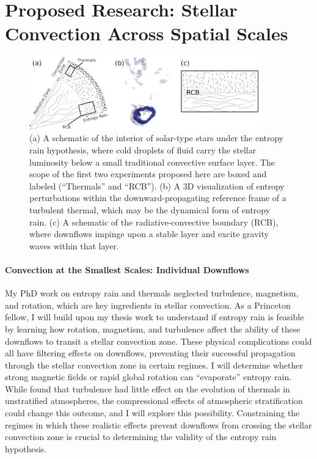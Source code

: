 \documentclass[onecolumn, hmargin=1in, vmargin=1in]{aastex62}
\begin{document}
\section*{\textbf{Proposed Research: Stellar Convection Across Spatial Scales}} 
\begin{figure}[t]
	\begin{center}
    \includegraphics[width=0.9\textwidth]{./figs/tri_panel.png}
	\end{center}
    \caption{ (a) A schematic of the interior of solar-type stars under the entropy rain hypothesis, where cold droplets of fluid carry the stellar luminosity below a small traditional convective surface layer.
	The scope of the first two experiments proposed here are boxed and labeled (``Thermals'' and ``RCB'').
	(b) A 3D visualization of entropy perturbations within the downward-propagating reference frame of a turbulent thermal, which may be the dynamical form of entropy rain.
	(c) A schematic of the radiative-convective boundary (RCB), where downflows impinge upon a stable layer and excite gravity waves within that layer.
	\label{fig:tri_panel} }
	\vspace{-17pt}
\end{figure}

\paragraph{Convection at the Smallest Scales: Individual Downflows} 
My PhD work on entropy rain and thermals \citep[][described above]{andersLB2019} neglected turbulence, magnetism, and rotation, which are key ingredients in stellar convection.
As a Princeton fellow, I will build upon my thesis work to understand if entropy rain is feasible by learning how rotation, magnetism, and turbulence affect the ability of these downflows to transit a stellar convection zone.
These physical complications could all have filtering effects on downflows, preventing their successful propagation through the stellar convection zone in certain regimes.
I will determine whether strong magnetic fields or rapid global rotation can ``evaporate'' entropy rain.
While \citet{lecoanet&jeevanjee2019} found that turbulence had little effect on the evolution of thermals in unstratified atmospheres, the compressional effects of atmospheric stratification could change this outcome, and I will explore this possibility.
Constraining the regimes in which these realistic effects prevent downflows from crossing the stellar convection zone is crucial to determining the validity of the entropy rain hypothesis.
\end{document}
